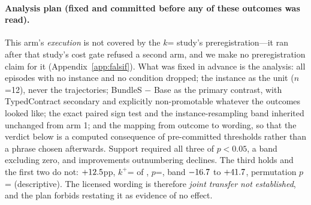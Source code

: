 \documentclass{article}
\begin{document}
\begin{table}[h]
\centering\footnotesize
\caption{\textbf{S3 panel}: per-instance outcomes for DeepSeek-V4-Pro over the same twelve frozen instances at $k$=\StatArmTwoK{} (\StatArmTwoEpisodes{} episodes). At this depth a cell can only read 0/2, 1/2 or 2/2, so a 1/2 is the sole expressible form of within-cell disagreement---which is precisely why no magnitude claim is made from these values, and why this table is not to be read against Table~\ref{tab:sta12k6} as though the two were equally resolved. \StatArmTwoInformativeN{} instances are informative; \StatArmTwoFloorN{} sit at the floor in both compared conditions and \StatArmTwoCeilingN{} at the ceiling. Generated by the same committed script as the panel above, from the same functions.}
\label{tab:sta12arm2}

\end{table}

\paragraph{Analysis plan (fixed and committed before any of these outcomes was read).} This arm's \emph{execution} is not covered by the $k$=\StatEightAK{} study's preregistration---it ran after that study's cost gate refused a second arm, and we make no preregistration claim for it (Appendix~\ref{app:falsif}). What was fixed in advance is the analysis: all \StatArmTwoEpisodes{} episodes with no instance and no condition dropped; the instance as the unit ($n$=12), never the trajectories; BundleS $-$ Base as the primary contrast, with TypedContract secondary and explicitly non-promotable whatever the outcomes looked like; the exact paired sign test and the instance-resampling band inherited unchanged from arm 1; and the mapping from outcome to wording, so that the verdict below is a computed consequence of pre-committed thresholds rather than a phrase chosen afterwards. Support required all three of $p<0.05$, a band excluding zero, and improvements outnumbering declines. The third holds and the first two do not: $+12.5$pp, $k^{+}$=\StatArmTwoSignPositive{} of \StatArmTwoSignNonzero{}, $p$=\StatArmTwoSignP{}, band $-16.7$ to $+41.7$, permutation $p$=\StatArmTwoPermP{} (descriptive). The licensed wording is therefore \emph{joint transfer not established}, and the plan forbids restating it as evidence of no effect.
\end{document}
